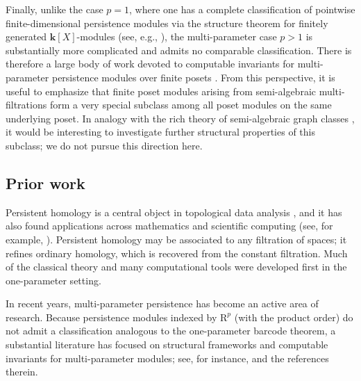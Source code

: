 \documentclass{amsart}[10pts]
\theoremstyle{definition}
\theoremstyle{remark}
\theoremstyle{observation}
\numberwithin{equation}{section}
\newcommand {\R} {\mathrm{R}}
\newcommand {\kk}         {\mathbf{k}}
\begin{document}
\medskip
Finally, unlike the case $p=1$, where one has a complete classification of pointwise finite-dimensional persistence modules via the structure theorem for finitely generated $\kk[X]$-modules (see, e.g., \cite{CZ2005}), the multi-parameter case $p>1$ is substantially more complicated and admits no comparable classification. There is therefore a large body of work devoted to computable invariants for multi-parameter persistence modules over finite posets \cite{miller2020homological,DX2022,DKM2024,BOO2022}. From this perspective, it is useful to emphasize that finite poset modules arising from semi-algebraic multi-filtrations form a very special subclass among all poset modules on the same underlying poset. In analogy with the rich theory of semi-algebraic graph classes \cite{Alon-Pach-et-al,Fox-et-al}, it would be interesting to investigate further structural properties of this subclass; we do not pursue this direction here.


\subsection{Prior work}
Persistent homology is a central object in topological data analysis \cite{dey2022computational,Weinberger_survey,Ghrist}, and it has also found applications across mathematics and scientific computing (see, for example, \cite{Ellis-King,Manin-Marcolli}). 
Persistent homology may be associated to any filtration of spaces; it refines ordinary homology, which is recovered from the constant filtration. 
Much of the classical theory and many computational tools were developed first in the one-parameter setting.

\medskip
In recent years, multi-parameter persistence has become an active area of research. 
Because persistence modules indexed by $\R^p$ (with the product order) do not admit a classification analogous to the one-parameter barcode theorem, a substantial literature has focused on structural frameworks and computable invariants for multi-parameter modules; see, for instance, \cite{Miller2023,arya2023} and the references therein.
\end{document}
